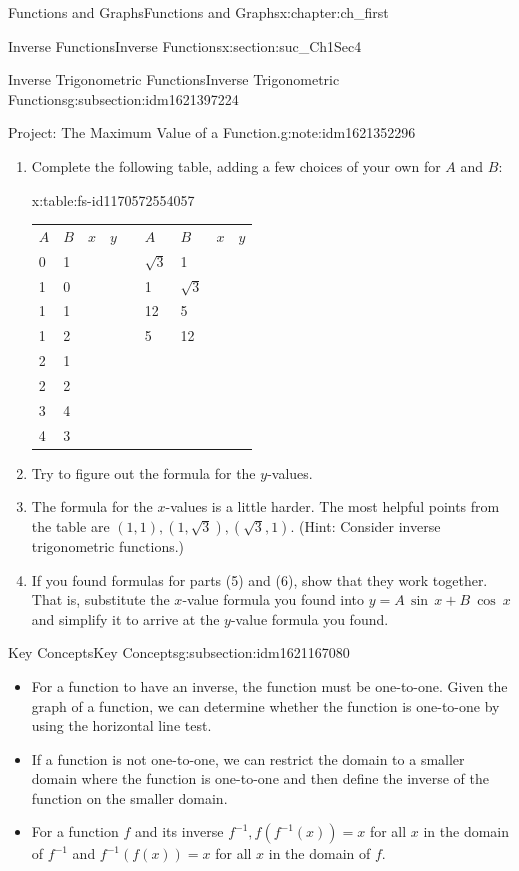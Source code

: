 \documentclass[oneside,10pt,]{book}
\newcommand{\tabularfont}{\relax}
\numberwithin{equation}{section}
\newcommand{\hrulethick} {\noalign{\hrule height 0.11em}}
\begin{document}
\begin{chapterptx}{Functions and Graphs}{}{Functions and Graphs}{}{}{x:chapter:ch_first}
\begin{sectionptx}{Inverse Functions}{}{Inverse Functions}{}{}{x:section:suc_Ch1Sec4}
\begin{subsectionptx}{Inverse Trigonometric Functions}{}{Inverse Trigonometric Functions}{}{}{g:subsection:idm1621397224}
\begin{note}{Project: The Maximum Value of a Function.}{g:note:idm1621352296}
\begin{enumerate}
\item{}Complete the following table, adding a few choices of your own for \(A\) and \(B\): \begin{tableptx}{\textbf{}}{x:table:fs-id1170572554057}{}%
\centering%
{\tabularfont%
\begin{tabular}{lllllllll}
\textbf{\(A\)}&\textbf{\(B\)}&\textbf{\(x\)}&\textbf{\(y\)}&\textbf{}&\textbf{\(A\)}&\textbf{\(B\)}&\textbf{\(x\)}&\textbf{\(y\)}\tabularnewline\hrulethick
0&1&&&&\(\sqrt{3}\)&1&&\tabularnewline[0pt]
1&0&&&&1&\(\sqrt{3}\)&&\tabularnewline[0pt]
1&1&&&&12&5&&\tabularnewline[0pt]
1&2&&&&5&12&&\tabularnewline[0pt]
2&1&&&&&&&\tabularnewline[0pt]
2&2&&&&&&&\tabularnewline[0pt]
3&4&&&&&&&\tabularnewline[0pt]
4&3&&&&&&&
\end{tabular}
}%
\end{tableptx}%
%
\item{}Try to figure out the formula for the \(y\)-values.%
\item{}The formula for the \(x\)-values is a little harder. The most helpful points from the table are \((1,1),(1,\sqrt{3}),(\sqrt{3},1).\) (Hint: Consider inverse trigonometric functions.)%
\item{}If you found formulas for parts (5) and (6), show that they work together. That is, substitute the \(x\)-value formula you found into \(y=A\,\sin\,x+B\,\text{ cos }\,x\) and simplify it to arrive at the \(y\)-value formula you found.%
\end{enumerate}
\end{note}
\end{subsectionptx}
%
%
\typeout{************************************************}
\typeout{************************************************}
%
\begin{subsectionptx}{Key Concepts}{}{Key Concepts}{}{}{g:subsection:idm1621167080}
%
\begin{itemize}[label=\textbullet]
\item{}For a function to have an inverse, the function must be one-to-one. Given the graph of a function, we can determine whether the function is one-to-one by using the horizontal line test.%
\item{}If a function is not one-to-one, we can restrict the domain to a smaller domain where the function is one-to-one and then define the inverse of the function on the smaller domain.%
\item{}For a function \(f\) and its inverse \(f^{-1} ,f(f^{-1} (x))=x\) for all \(x\) in the domain of \(f^{-1} \) and \(f^{-1} (f(x))=x\) for all \(x\) in the domain of \(f.\)%

\end{itemize}
\end{subsectionptx}
\end{sectionptx}
\end{chapterptx}
\end{document}
